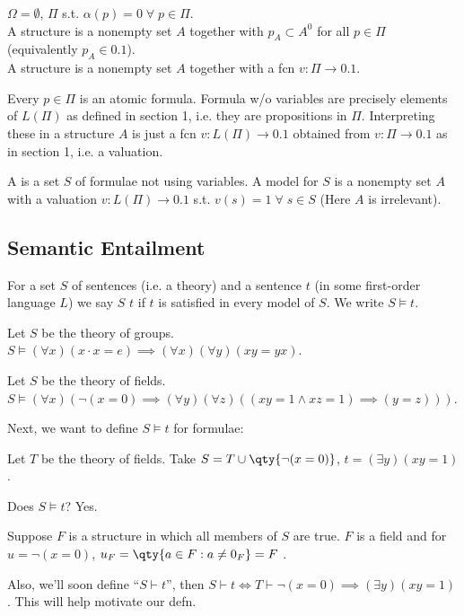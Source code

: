 \begin{example}
    $\Omega = \emptyset$, $\Pi$ s.t. $\alpha(p) = 0 \; \forall \; p \in \Pi$. \\
    A structure is a nonempty set $A$ together with $p_A \subset A^0$ for all $p \in \Pi$ (equivalently $p_A \in \qty{0, 1}$). \\
    A structure is a nonempty set $A$ together with a fcn $v : \Pi \to \qty{0, 1}$.

    Every $p \in \Pi$ is an atomic formula.
    Formula w/o variables are precisely elements of $L(\Pi)$ as defined in section 1, i.e. they are propositions in $\Pi$.
    Interpreting these in a structure $A$ is just a fcn $v : L(\Pi) \to \qty{0, 1}$ obtained from $v : \Pi \to \qty{0, 1}$ as in section 1, i.e. a valuation.

    A  is a set $S$ of formulae not using variables.
    A model for $S$ is a nonempty set $A$ with a valuation $v : L(\Pi) \to \qty{0, 1}$ s.t. $v(s) = 1 \; \forall \; s \in S$ (Here $A$ is irrelevant).
\end{example}

\subsection{Semantic Entailment}

\begin{definition}
    For a set $S$ of sentences (i.e. a theory) and a sentence $t$ (in some first-order language $L$) we say $S$  $t$ if $t$ is satisfied in every model of $S$.
    We write $S \models t$.
\end{definition}

\begin{example}[Groups]
    Let $S$ be the theory of groups.
    $S \models (\forall x)(x \cdot x = e) \implies (\forall x) (\forall y) (xy = yx)$.
\end{example}

\begin{example}[Fields]
    Let $S$ be the theory of fields.
    $S \models (\forall x) (\neg(x = 0) \implies (\forall y) (\forall z) ((xy = 1 \wedge xz = 1) \implies (y = z)))$.
\end{example}

Next, we want to define $S \models t$ for formulae:
\begin{example}
    Let $T$ be the theory of fields.
    Take $S = T \cup \qty{\neg(x = 0)}$, $t = (\exists y) (xy = 1)$.

    Does $S \models t$?
    Yes.

    Suppose $F$ is a structure in which all members of $S$ are true.
    $F$ is a field and for $u = \neg(x = 0)$, $u_F = \qty{a \in F : a \neq 0_F} = F$ \Lightning.

    Also, we'll soon define ``$S \vdash t$'', then $S \vdash t \iff T \vdash \neg(x = 0) \implies (\exists y)(xy = 1)$.
    This will help motivate our defn.
\end{example}

